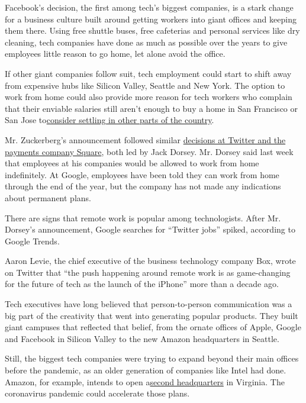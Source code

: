 Facebook's decision, the first among tech's biggest companies, is a
stark change for a business culture built around getting workers into
giant offices and keeping them there. Using free shuttle buses, free
cafeterias and personal services like dry cleaning, tech companies have
done as much as possible over the years to give employees little reason
to go home, let alone avoid the office.

If other giant companies follow suit, tech employment could start to
shift away from expensive hubs like Silicon Valley, Seattle and New
York. The option to work from home could also provide more reason for
tech workers who complain that their enviable salaries still aren't
enough to buy a home in San Francisco or San Jose
to\href{https://www.nytimes3xbfgragh.onion/2019/05/09/technology/uber-lyft-low-tax-millennials.html}{consider
settling in other parts of the country}.

Mr. Zuckerberg's announcement followed similar
\href{https://www.nytimes3xbfgragh.onion/2020/05/08/technology/coronavirus-work-from-home.html}{decisions
at Twitter and the payments company Square}, both led by Jack Dorsey.
Mr. Dorsey said last week that employees at his companies would be
allowed to work from home indefinitely. At Google, employees have been
told they can work from home through the end of the year, but the
company has not made any indications about permanent plans.

There are signs that remote work is popular among technologists. After
Mr. Dorsey's announcement, Google searches for ``Twitter jobs'' spiked,
according to Google Trends.

Aaron Levie, the chief executive of the business technology company Box,
wrote on Twitter that ``the push happening around remote work is as
game-changing for the future of tech as the launch of the iPhone'' more
than a decade ago.

Tech executives have long believed that person-to-person communication
was a big part of the creativity that went into generating popular
products. They built giant campuses that reflected that belief, from the
ornate offices of Apple, Google and Facebook in Silicon Valley to the
new Amazon headquarters in Seattle.

Still, the biggest tech companies were trying to expand beyond their
main offices before the pandemic, as an older generation of companies
like Intel had done. Amazon, for example, intends to open
a\href{https://www.nytimes3xbfgragh.onion/2019/02/14/nyregion/amazon-hq2-queens.html}{second
headquarters} in Virginia. The coronavirus pandemic could accelerate
those plans.

